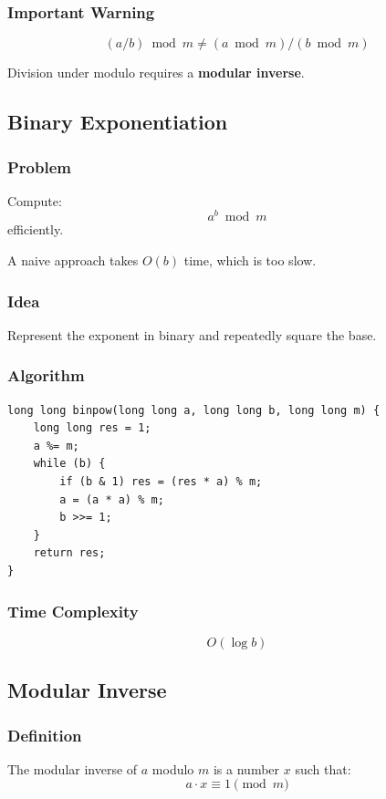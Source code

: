 \documentclass[11pt]{article}
\begin{document}
\subsubsection{Important Warning}
\[
(a / b) \bmod m \neq (a \bmod m) / (b \bmod m)
\]

Division under modulo requires a \textbf{modular inverse}.

\subsection{Binary Exponentiation}

\subsubsection{Problem}
Compute:
\[
a^b \bmod m
\]
efficiently.

A naive approach takes $O(b)$ time, which is too slow.

\subsubsection{Idea}
Represent the exponent in binary and repeatedly square the base.

\subsubsection{Algorithm}
\begin{lstlisting}
long long binpow(long long a, long long b, long long m) {
    long long res = 1;
    a %= m;
    while (b) {
        if (b & 1) res = (res * a) % m;
        a = (a * a) % m;
        b >>= 1;
    }
    return res;
}
\end{lstlisting}

\subsubsection{Time Complexity}
\[
O(\log b)
\]

\subsection{Modular Inverse}

\subsubsection{Definition}
The modular inverse of $a$ modulo $m$ is a number $x$ such that:
\[
a \cdot x \equiv 1 \pmod{m}
\]
\end{document}
